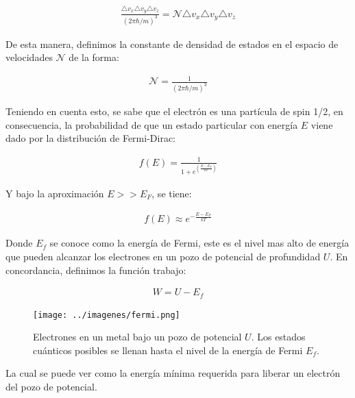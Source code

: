 \documentclass[%
 reprint,
 amsmath,amssymb,
 aps,
]{revtex4-2}
\begin{document}
\begin{align*}
    \frac{\triangle v_{x}\triangle v_{y}\triangle v_{z}}{(2\pi\hbar/m)^{3}}= \mathcal{N} \triangle v_{x}\triangle v_{y}\triangle v_{z}
\end{align*}

\vspace{0.2 cm}
De esta manera, definimos la constante de densidad de estados en el espacio de velocidades $\mathcal{N}$ de la forma:

\begin{align}
    \label{densidaddeestd}
    \mathcal{N} = \frac{1}{(2\pi\hbar/m)^{3}}
\end{align}

\vspace{0.2 cm}
Teniendo en cuenta esto, se sabe que el electrón es una partícula de spin 1/2, en consecuencia, la probabilidad de que un estado particular con energía $E$ viene dado por la distribución de Fermi-Dirac:

\begin{align*}
    f(E) = \frac{1}{1+e^{(\frac{E-E_{F}}{kT})}}
\end{align*}

\vspace{0.2 cm}
Y bajo la aproximación $E>>E_{F}$, se tiene:

\begin{align}
    f(E) \approx e^{-\frac{E-E_{F}}{kT}}
    \label{eq: Energía de Fermi}
\end{align}

\vspace{0.2 cm}
Donde $E_f$ se conoce como la energía de Fermi, este es el nivel mas alto de energía que pueden alcanzar los electrones en un pozo de potencial de profundidad $U$. En concordancia, definimos la función trabajo:

\begin{align*}
    W = U - E_f
\end{align*}

\begin{figure}[H]
    \centering
    \texttt{[image: ../imagenes/fermi.png]}
    \caption{Electrones en un metal bajo un pozo de potencial $U$. Los estados cuánticos posibles se llenan hasta el nivel de la energía de Fermi $E_f$.}
    \label{fig:3}
\end{figure}

\vspace{0.2 cm}
La cual se puede ver como la energía mínima requerida para liberar un electrón del pozo de potencial.
\\
\end{document}
